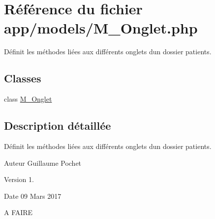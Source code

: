 \hypertarget{_m___onglet_8php}{}\section{Référence du fichier app/models/\+M\+\_\+\+Onglet.php}
\label{_m___onglet_8php}


Définit les méthodes liées aux différents onglets d\textquotesingle{}un dossier patients.  


\subsection*{Classes}
\begin{DoxyCompactItemize}
\item 
class \hyperlink{class_m___onglet}{M\+\_\+\+Onglet}
\end{DoxyCompactItemize}


\subsection{Description détaillée}
Définit les méthodes liées aux différents onglets d\textquotesingle{}un dossier patients. 

\begin{DoxyAuthor}{Auteur}
Guillaume Pochet 
\end{DoxyAuthor}
\begin{DoxyVersion}{Version}
1. 
\end{DoxyVersion}
\begin{DoxyDate}{Date}
09 Mars 2017
\end{DoxyDate}
A F\+A\+I\+RE 